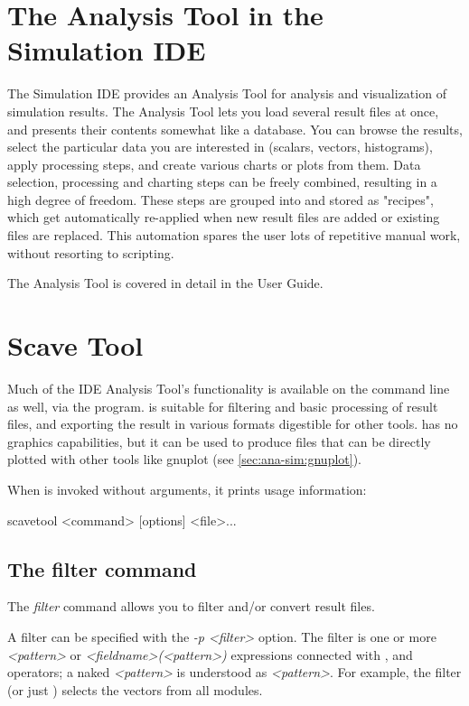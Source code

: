 \section{The Analysis Tool in the Simulation IDE}

The Simulation IDE provides an Analysis Tool for analysis and visualization
of simulation results. The Analysis Tool lets you load several result files
at once, and presents their contents somewhat like a database. You can
browse the results, select the particular data you are interested in
(scalars, vectors, histograms), apply processing steps, and create various
charts or plots from them. Data selection, processing and charting steps
can be freely combined, resulting in a high degree of freedom.
These steps are grouped into and stored as "recipes", which get automatically
re-applied when new result files are added or existing files are
replaced. This automation spares the user lots of repetitive manual work,
without resorting to scripting.

The Analysis Tool is covered in detail in the User Guide.


\section{Scave Tool}
\label{sec:ana-sim:scavetool}

Much of the IDE Analysis Tool's functionality is available on the command
line as well, via the  program.  is
suitable for filtering and basic processing of result files, and
exporting the result in various formats digestible for other tools.
 has no graphics capabilities, but it can be used
to produce files that can be directly plotted with other tools like
gnuplot (see \ref{sec:ana-sim:gnuplot}).

When  is invoked without arguments, it prints usage information:

\begin{commandline}
scavetool <command> [options] <file>...
\end{commandline}

\subsection{The filter command}

The \textit{filter} command allows you to filter and/or convert result files.

A filter can be specified with the \textit{-p <filter>} option.
The filter is one or more \textit{<pattern>} or \textit{<fieldname>(<pattern>)}
expressions connected with ,  and  operators;
a naked \textit{<pattern>} is understood as \textit{<pattern>}\ttt{)}.
For example, the filter  (or just
) selects the  vectors from all
 modules.

